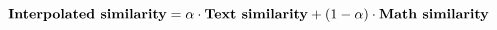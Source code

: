 \begin{equation}
  \text{\textbf{Interpolated similarity}} =
    \alpha\cdot\text{\textbf{Text similarity}} +
    (1 - \alpha)\cdot\text{\textbf{Math similarity}}
\end{equation}
